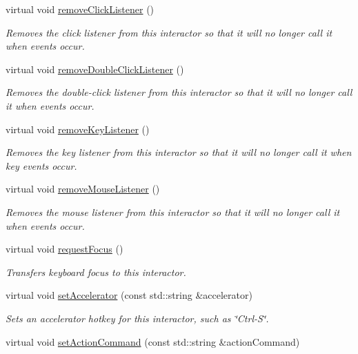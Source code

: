 \begin{DoxyCompactItemize}
virtual void \mbox{\hyperlink{classGInteractor_ad39d0325cde6b97ebda4b9d7787c633b}{remove\+Click\+Listener}} ()
\begin{DoxyCompactList}\small\item\em Removes the click listener from this interactor so that it will no longer call it when events occur. \end{DoxyCompactList}\item 
virtual void \mbox{\hyperlink{classGInteractor_aa4250907e4cdd77349c04f0cf5cdd3d3}{remove\+Double\+Click\+Listener}} ()
\begin{DoxyCompactList}\small\item\em Removes the double-\/click listener from this interactor so that it will no longer call it when events occur. \end{DoxyCompactList}\item 
virtual void \mbox{\hyperlink{classGInteractor_a43095f41cab3be732b49f29970484b05}{remove\+Key\+Listener}} ()
\begin{DoxyCompactList}\small\item\em Removes the key listener from this interactor so that it will no longer call it when key events occur. \end{DoxyCompactList}\item 
virtual void \mbox{\hyperlink{classGInteractor_aff47f71ce47e688a07c9d38dc92fcc11}{remove\+Mouse\+Listener}} ()
\begin{DoxyCompactList}\small\item\em Removes the mouse listener from this interactor so that it will no longer call it when events occur. \end{DoxyCompactList}\item 
virtual void \mbox{\hyperlink{classGInteractor_a519fb2ac767f8b2febbb50b898b8c8cb}{request\+Focus}} ()
\begin{DoxyCompactList}\small\item\em Transfers keyboard focus to this interactor. \end{DoxyCompactList}\item 
virtual void \mbox{\hyperlink{classGInteractor_ad15f102f62e2960576012f1aa0ba4b2e}{set\+Accelerator}} (const std\+::string \&accelerator)
\begin{DoxyCompactList}\small\item\em Sets an accelerator hotkey for this interactor, such as \char`\"{}\+Ctrl-\/\+S\char`\"{}. \end{DoxyCompactList}\item 
virtual void \mbox{\hyperlink{classGInteractor_a4b5843fe3030e038a1ba54cc03389bcf}{set\+Action\+Command}} (const std\+::string \&action\+Command)

\end{DoxyCompactItemize}
